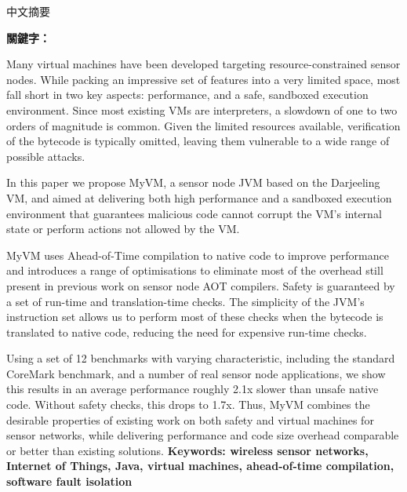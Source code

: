 \begin{abstractzh}
中文摘要

\bigbreak
\noindent \textbf{關鍵字：}{\, \makeatletter \@keywordszh \makeatother}
\end{abstractzh}

\begin{abstracten}
Many virtual machines have been developed targeting resource-constrained sensor nodes. While packing an impressive set of features into a very limited space, most fall short in two key aspects: performance, and a safe, sandboxed execution environment. Since most existing VMs are interpreters, a slowdown of one to two orders of magnitude is common. Given the limited resources available, verification of the bytecode is typically omitted, leaving them vulnerable to a wide range of possible attacks.

In this paper we propose MyVM, a sensor node JVM based on the Darjeeling VM, and aimed at delivering both high performance and a sandboxed execution environment that guarantees malicious code cannot corrupt the VM's internal state or perform actions not allowed by the VM.

MyVM uses Ahead-of-Time compilation to native code to improve performance and introduces a range of optimisations to eliminate most of the overhead still present in previous work on sensor node AOT compilers. Safety is guaranteed by a set of run-time and translation-time checks. The simplicity of the JVM's instruction set allows us to perform most of these checks when the bytecode is translated to native code, reducing the need for expensive run-time checks.

Using a set of 12 benchmarks with varying characteristic, including the standard CoreMark benchmark, and a number of real sensor node applications, we show this results in an average performance roughly 2.1x slower than unsafe native code. Without safety checks, this drops to 1.7x. Thus, MyVM combines the desirable properties of existing work on both safety and virtual machines for sensor networks, while delivering performance and code size overhead comparable or better than existing solutions.
\bigbreak
\noindent \textbf{Keywords: wireless sensor networks, Internet of Things, Java, virtual machines, ahead-of-time compilation, software fault isolation}{\, \makeatletter \@keywordsen \makeatother}
\end{abstracten}

\begin{comment}


\end{comment}
